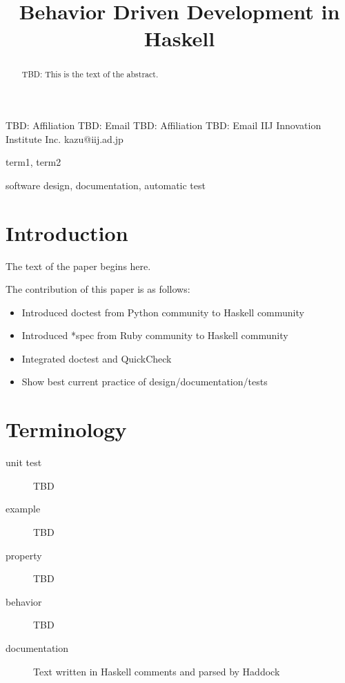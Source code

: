 \documentclass[preprint]{sigplanconf}
\begin{document}
\copyrightdata{[to be supplied]} 


\title{Behavior Driven Development in Haskell}

           {TBD: Affiliation}
           {TBD: Email}
           {TBD: Affiliation}
           {TBD: Email}
           {IIJ Innovation Institute Inc.}
           {kazu@iij.ad.jp}

\maketitle

\begin{abstract}
TBD: This is the text of the abstract.
\end{abstract}


\terms
term1, term2

\keywords
software design, documentation, automatic test

\section{Introduction}

The text of the paper begins here.

The contribution of this paper is as follows:

\begin{itemize}
\item Introduced doctest from Python community to Haskell community
\item Introduced *spec from Ruby community to Haskell community
\item Integrated doctest and QuickCheck
\item Show best current practice of design/documentation/tests
\end{itemize}

\section{Terminology}

\begin{description}
\item[unit test] TBD
\item[example] TBD
\item[property] TBD
\item[behavior] TBD
\item[documentation] Text written in Haskell comments and parsed by Haddock
\end{description}
\end{document}
